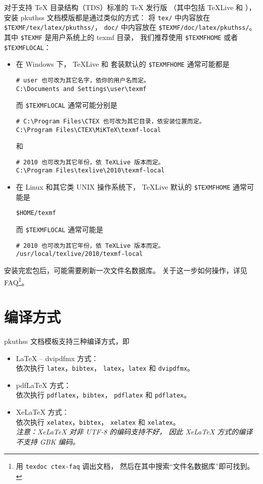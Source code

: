 	对于支持 \TeX{} 目录结构（TDS）标准的 \TeX{} 发行版%
	（其中包括 \TeX{}Live 和 \CTeX{}），
	安装 pkuthss 文档模版都是通过类似的方式：
	将 \verb|tex/| 中内容放在 \verb|$TEXMF/tex/latex/pkuthss/|，
	\verb|doc/| 中内容放在 \verb|$TEXMF/doc/latex/pkuthss/|。
	其中 \verb|$TEXMF| 是用户系统上的 texmf 目录，
	我们推荐使用 \verb|$TEXMFHOME| 或者 \verb|$TEXMFLOCAL|：
	\begin{itemize}
		\item 在 Windows 下，
			\TeX{}Live 和 \CTeX{} 套装默认的 \verb|$TEXMFHOME| %
			通常可能都是
\begin{Verbatim}[frame=single]
# user 也可改为其它名字，依你的用户名而定。
C:\Documents and Settings\user\texmf
\end{Verbatim}
			而 \verb|$TEXMFLOCAL| 通常可能分别是
\begin{Verbatim}[frame=single]
# C:\Program Files\CTEX 也可改为其它目录，依安装位置而定。
C:\Program Files\CTEX\MiKTeX\texmf-local
\end{Verbatim}
			和
\begin{Verbatim}[frame=single]
# 2010 也可改为其它年份，依 TeXLive 版本而定。
C:\Program Files\texlive\2010\texmf-local
\end{Verbatim}
		\item 在 Linux 和其它类 UNIX 操作系统下，
			\TeX{}Live 默认的 \verb|$TEXMFHOME| 通常可能是
\begin{Verbatim}[frame=single]
$HOME/texmf
\end{Verbatim}
			而 \verb|$TEXMFLOCAL| 通常可能是
\begin{Verbatim}[frame=single]
# 2010 也可改为其它年份，依 TeXLive 版本而定。
/usr/local/texlive/2010/texmf-local
\end{Verbatim}
	\end{itemize}

	安装完宏包后，可能需要刷新一次文件名数据库。
	关于这一步如何操作，详见 \CTeX{} FAQ\cite{ctex-faq}\footnote{%
		用 \texttt{texdoc ctex-faq} 调出文档，
		然后在其中搜索“文件名数据库”即可找到。%
	}。

	\section{编译方式}

	pkuthss 文档模板支持三种编译方式，即
	\begin{itemize}
		\item \LaTeX{} -- dvipdfmx 方式：\\
			依次执行 \verb|latex|，\verb|bibtex|，%
			\verb|latex|，\verb|latex| 和 \verb|dvipdfmx|。
		\item pdf\LaTeX{} 方式：\\
			依次执行 \verb|pdflatex|，\verb|bibtex|，%
			\verb|pdflatex| 和 \verb|pdflatex|。
		\item Xe\LaTeX{} 方式：\\
			依次执行 \verb|xelatex|，\verb|bibtex|，%
			\verb|xelatex| 和 \verb|xelatex|。\\
			\emph{%
				注意：Xe\LaTeX{} 对非 UTF-8 的编码支持不好，
				因此 Xe\LaTeX{} 方式的编译不支持 GBK 编码。
			}
	\end{itemize}

